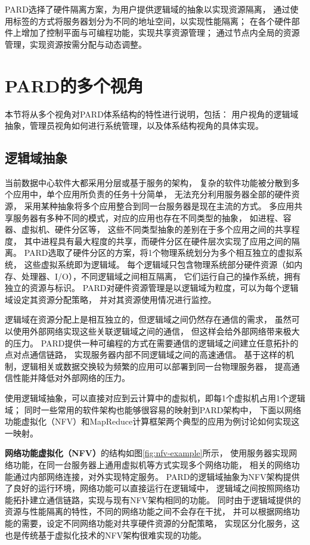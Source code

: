 PARD选择了硬件隔离方案，为用户提供逻辑域的抽象以实现资源隔离，
通过使用标签的方式将服务器划分为不同的地址空间，以实现性能隔离；
在各个硬件部件上增加了控制平面与可编程功能，实现共享资源管理；
通过节点内全局的资源管理，实现资源按需分配与动态调整。


\section{PARD的多个视角}

本节将从多个视角对PARD体系结构的特性进行说明，包括：
用户视角的逻辑域抽象，管理员视角如何进行系统管理，以及体系结构视角的具体实现。

\subsection{逻辑域抽象}

当前数据中心软件大都采用分层或基于服务的架构，
复杂的软件功能被分散到多个应用中，单个应用所负责的任务十分简单，
无法充分利用服务器全部的硬件资源，
采用某种抽象将多个应用整合到同一台服务器是现在主流的方式。
多应用共享服务器有多种不同的模式，对应的应用也存在不同类型的抽象，
如进程、容器、虚拟机、硬件分区\cite{LDom,IBM_LPAR:2007}等，
这些不同类型抽象的差别在于多个应用之间的共享程度，
其中进程具有最大程度的共享，而硬件分区在硬件层次实现了应用之间的隔离。
PARD选取了硬件分区的方案，将1个物理系统划分为多个相互独立的虚拟系统，
这些虚拟系统即为逻辑域。
每个逻辑域只包含物理系统部分硬件资源（如内存、处理器、I/O），不同逻辑域之间相互隔离，
它们运行自己的操作系统，拥有独立的资源与标识。
PARD对硬件资源管理是以逻辑域为粒度，可以为每个逻辑域设定其资源分配策略，
并对其资源使用情况进行监控。

逻辑域在资源分配上是相互独立的，但逻辑域之间仍然存在通信的需求，
虽然可以使用外部网络实现这些关联逻辑域之间的通信，
但这样会给外部网络带来极大的压力。%
PARD提供一种可编程的方式在需要通信的逻辑域之间建立任意拓扑的点对点通信链路，
实现服务器内部不同逻辑域之间的高速通信。
基于这样的机制，逻辑相关或数据交换较为频繁的应用可以部署到同一台物理服务器，
提高通信性能并降低对外部网络的压力。

使用逻辑域抽象，可以直接对应到云计算中的虚拟机，即每1个虚拟机占用1个逻辑域；
同时一些常用的软件架构也能够很容易的映射到PARD架构中，
下面以网络功能虚拟化（NFV）和MapReduce计算框架两个典型的应用为例讨论如何实现这一映射。

\textbf{网络功能虚拟化（NFV）}的结构如图\ref{fig:nfv-example}所示，
使用服务器实现网络功能，在同一台服务器上通用虚拟机等方式实现多个网络功能，
相关的网络功能通过内部网络连接，对外实现特定服务。
PARD的逻辑域抽象为NFV架构提供了良好的运行环境，网络功能可以直接运行在逻辑域中，
逻辑域之间按照网络功能拓扑建立通信链路，实现与现有NFV架构相同的功能。
同时由于逻辑域提供的资源与性能隔离的特性，不同的网络功能之间不会存在干扰，
并可以根据网络功能的需要，设定不同网络功能对共享硬件资源的分配策略，
实现区分化服务，这也是传统基于虚拟化技术的NFV架构很难实现的功能。

